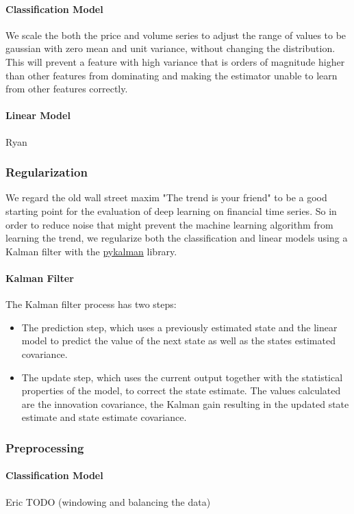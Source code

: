 \documentclass{article}
\begin{document}
\begin{multicols}{2}
\paragraph{Classification Model}
We scale the both the price and volume series to adjust the range of values to be gaussian with zero mean and unit variance, without changing the distribution. This will prevent a feature with high variance that is orders of magnitude higher than other features from dominating and making the estimator unable to learn from other features correctly.
\paragraph{Linear Model}
Ryan

\subsubsection{Regularization}
We regard the old wall street maxim "The trend is your friend" to be a good starting point for the evaluation of deep learning on financial time series. So in order to reduce noise that might prevent the machine learning algorithm from learning the trend, we regularize both the classification and linear models using a Kalman filter with the \href{https://pykalman.github.io/}{pykalman} library.


\paragraph{Kalman Filter}
The Kalman filter process has two steps:
\begin{itemize}
\item The prediction step, which uses a previously estimated state and
  the linear model to predict the value of the next state as well as
  the states estimated covariance.

\item The update step, which uses the current output together with the statistical properties of the model, to
  correct the state estimate. The values calculated are the innovation
  covariance, the Kalman gain resulting in the updated state estimate
  and state estimate covariance.
\end{itemize}


\subsubsection{Preprocessing}
\paragraph{Classification Model}
Eric TODO (windowing and balancing the data) \cite{4_website}

\end{multicols}
\end{document}
